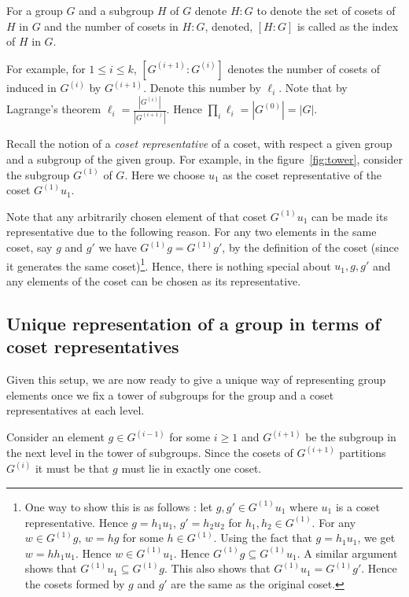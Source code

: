 \begin{definition}
	For a group $G$ and a subgroup $H$ of $G$ denote $H:G$ to denote the
	set of cosets of $H$ in $G$ and the number of cosets in $H:G$,
	denoted, $[H:G]$ is called as the index of $H$ in $G$.
\end{definition}

For example, for $1\le i \le k$, $[G^{(i+1)}:G^{(i)}]$ denotes the number of
cosets of induced in $G^{(i)}$ by $G^{(i+1)}$. Denote this number by $\ell_i$.
Note that by Lagrange's theorem $\ell_i = \frac{|G^{(i)}|}{|G^{(i+1)}|}$.
Hence $\prod_{i} \ell_i = |G^{(0)}| = |G|$.

Recall the notion of a {\it coset representative} of a coset, with respect a
given group and a subgroup of the given group. For example, in the
figure~\ref{fig:tower}, consider the subgroup $G^{(1)}$ of $G$. Here we choose
$u_1$ as the coset representative of the coset $G^{(1)}u_1$.

Note that any arbitrarily chosen element of that coset $G^{(1)}u_1$ can be
made its representative due to the following reason. For any two elements in
the same coset, say $g$ and $g'$ we have $G^{(1)}g = G^{(1)}g'$, by the
definition of the coset (since it generates the same coset)\footnote{One way
	to show this is as follows : let $g, g' \in G^{(1)}u_1$ where $u_1$ is
	a coset representative. Hence $g = h_1u_1$, $g' = h_2u_2$ for $h_1,h_2
	\in G^{(1)}$. For any $w \in G^{(1)}g$, $w = hg$ for some 
	$h \in G^{(1)}$. Using the fact that $g = h_1u_1$, we get $w = hh_1u_1$.
	Hence $w \in G^{(1)}u_1$. Hence $G^{(1)}g \subseteq G^{(1)}u_1$. 
	A similar argument shows that $G^{(1)}u_1 \subseteq G^{(1)}g$. This
	also shows that $G^{(1)}u_1 = G^{(1)}g'$. Hence the cosets formed by
$g$ and $g'$ are the same as the original coset.}.  Hence, there is nothing
special about $u_1, g, g'$ and any elements of the coset can be chosen as its
representative.

\subsection{Unique representation of a group in terms of coset representatives}
Given this setup, we are now ready to give a unique way of representing group
elements once we fix a tower of subgroups for the group and a coset
representatives at each level.

Consider an element $g \in G^{(i-1)}$ for some $i \ge 1$ and $G^{(i+1)}$ be the
subgroup in the next level in the tower of subgroups. Since the cosets of
$G^{(i+1)}$ partitions $G^{(i)}$ it must be that $g$ must lie in exactly one
coset.


